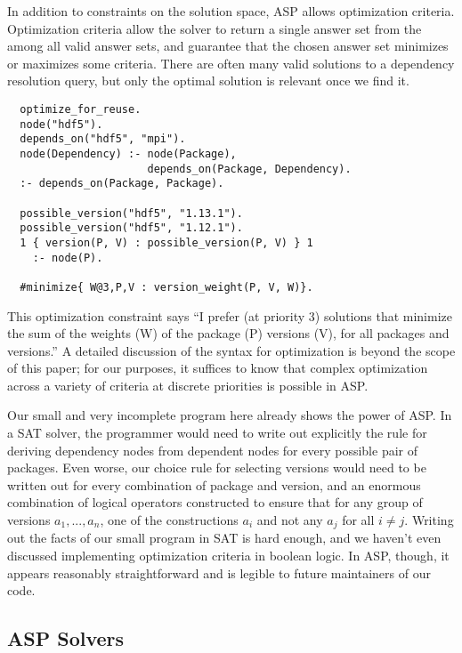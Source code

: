 In addition to constraints on the solution space, ASP allows optimization criteria.
Optimization criteria allow the solver to return a single answer set from the among all valid answer sets, and guarantee that the chosen answer set minimizes or maximizes some criteria.
There are often many valid solutions to a dependency resolution query, but only the optimal solution is relevant once we find it.

\begin{verbatim}
  optimize_for_reuse.
  node("hdf5").
  depends_on("hdf5", "mpi").
  node(Dependency) :- node(Package),
                      depends_on(Package, Dependency).
  :- depends_on(Package, Package).

  possible_version("hdf5", "1.13.1").
  possible_version("hdf5", "1.12.1").
  1 { version(P, V) : possible_version(P, V) } 1
    :- node(P).

  #minimize{ W@3,P,V : version_weight(P, V, W)}.
\end{verbatim}

This optimization constraint says ``I prefer (at priority 3) solutions that minimize the sum of the weights (W) of the package (P) versions (V), for all packages and versions.''
A detailed discussion of the syntax for optimization is beyond the scope of this paper; for our purposes, it suffices to know that complex optimization across a variety of criteria at discrete priorities is possible in ASP.

Our small and very incomplete program here already shows the power of ASP.
In a SAT solver, the programmer would need to write out explicitly the rule for deriving dependency nodes from dependent nodes for every possible pair of packages.
Even worse, our choice rule for selecting versions would need to be written out for every combination of package and version, and an enormous combination of logical operators constructed to ensure that for any group of versions \texttt{$a_1, ..., a_n$}, one of the constructions \texttt{$a_i$} and not any \texttt{$a_j$} for all $i\neq{j}$.
Writing out the facts of our small program in SAT is hard enough, and we haven't even discussed implementing optimization criteria in boolean logic.
In ASP, though, it appears reasonably straightforward and is legible to future maintainers of our code.

\subsection{ASP Solvers}

